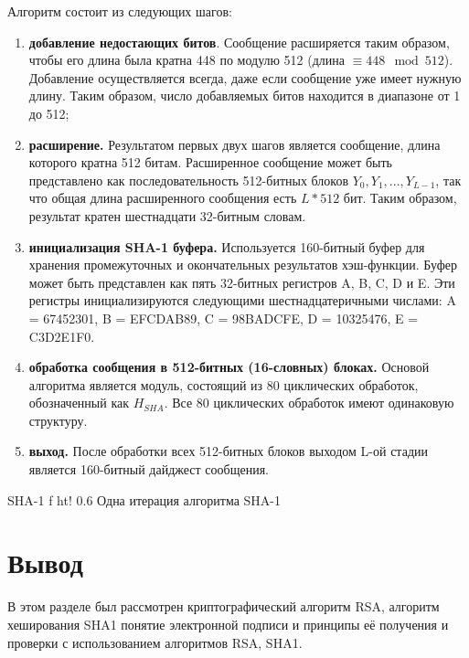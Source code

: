 Алгоритм состоит из следующих шагов:

\begin{enumerate}
	\item \textbf{добавление недостающих битов}. Сообщение расширяется таким образом, чтобы его длина была кратна 448 по модулю 512 (длина $\equiv  448 \mod 512$). Добавление осуществляется всегда, даже если сообщение уже имеет нужную длину. Таким образом, число добавляемых битов находится в диапазоне от 1 до 512;
	\item \textbf{расширение.} Результатом первых двух шагов является сообщение, длина которого кратна 512 битам. Расширенное сообщение может быть представлено как последовательность 512-битных блоков $Y_0, Y_1, . . . , Y_{L-1}$, так что общая длина расширенного сообщения есть $L * 512$ бит. Таким образом, результат кратен шестнадцати 32-битным словам.
	\item \textbf{инициализация SHA-1 буфера.} Используется 160-битный буфер для хранения промежуточных и окончательных результатов хэш-функции. Буфер может быть представлен как пять 32-битных регистров A, B, C, D и E. Эти регистры инициализируются следующими шестнадцатеричными числами: A = 67452301, B = EFCDAB89, C = 98BADCFE, D = 10325476, E = C3D2E1F0.
	\item \textbf{обработка сообщения в 512-битных (16-словных) блоках.} Основой алгоритма является модуль, состоящий из 80 циклических обработок, обозначенный как $H_{SHA}$. Все 80 циклических обработок имеют одинаковую структуру.
	\item \textbf{выход.} После обработки всех 512-битных блоков выходом L-ой стадии является 160-битный дайджест сообщения.
\end{enumerate}

{SHA-1}
{f}
{ht!} 
{0.6\textwidth}
{Одна итерация алгоритма SHA-1}

\section*{Вывод} 

В этом разделе был рассмотрен криптографический алгоритм RSA, алгоритм хеширования SHA1 понятие электронной подписи и принципы её получения и проверки с использованием алгоритмов RSA, SHA1.
